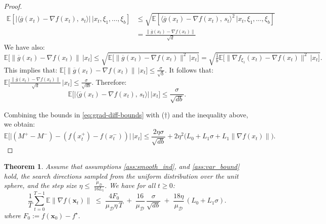 \documentclass[twoside]{article}
\theoremstyle{plain}
\newtheorem{theorem}[lemma]{Theorem}
\theoremstyle{definition}
\theoremstyle{remark}
\def\vx{{\bm{x}}}
\begin{document}
\begin{proof}
\begin{align*}
    \mathbb{E}[ \big|\langle \overline g(x_t)-\nabla f(x_t),\,s_t\rangle\big|   \, |x_t,\xi_1,\ldots,\xi_b  ] &\le \sqrt{ \mathbb{E}[ \langle \overline g(x_t)-\nabla f(x_t),\,s_t\rangle^2   \, |x_t,\xi_1,\ldots,\xi_b   ]  }\\
    &=\frac{\|\overline g(x_t)-\nabla f(x_t)\| }{\sqrt{d}} 
\end{align*}
We  have also:  $\mathbb{E}\big[\|\overline g(x_t)-\nabla f(x_t)\| \, | x_t \big]\le \sqrt{\mathbb{E}\big[ \|\overline g(x_t)-\nabla f(x_t)\|^2 \, | x_t  \big] }=\sqrt{\frac{1}{b} \mathbb{E}\big[ \|\nabla f_{\xi_1}(x_t)-\nabla f(x_t)\|^2 \, | x_t  \big]  }.$ This implies that: $\mathbb{E}\big[\|\overline g(x_t)-\nabla f(x_t)\| \, | x_t \big]\le \frac{\sigma}{\sqrt{b}}.$ It follows that: $\mathbb{E}\big[\frac{\|\overline g(x_t)-\nabla f(x_t)\| }{\sqrt{d}}  \, | x_t\big]\le \frac{\sigma}{\sqrt{db}}.$ Therefore:
$$ \mathbb{E}\big[ \big|\langle \overline g(x_t)-\nabla f(x_t),\,s_t\rangle\big|\, | x_t   \big]\le  \frac{\sigma}{\sqrt{db}}.$$


Combining the bounds in \ref{eq:grad-diff-bounds} with ($\dagger$) and the inequality above, we obtain:
$$\mathbb{E}\big[\big|(M^+-M^-) - (f(x_t^+)-f(x_t^-))\big|  \, \big| x_t\big]\le\frac{2\eta \sigma}{\sqrt{db}}+ 2\eta^2\big(L_0+L_1\sigma + L_1\| \nabla f(x_t) \| \big).$$
\end{proof}





\begin{propbox}

\begin{theorem}\label{lem:indiv-descent}
Assume that assumptions \ref{ass:smooth_ind}, and \ref{ass:var_bound} hold, the search directions sampled from the uniform distribution over the unit sphere, and the step size $
\eta \le \; \frac{\mu_{\mathcal{D}}}{16L_1}
$. We have for all $t \ge 0$:
\[
\frac{1}{T}\sum_{t=0}^{T-1}\mathbb{E}\big\|\nabla f(\vx_t)\big\|
\;\le\;
\frac{4F_0}{\mu_{\mathcal{D}}\eta\,T}
\;+\;\frac{16}{\mu_{\mathcal{D}}}\,\frac{\sigma}{\sqrt{db}}
\;+\;\frac{18\eta}{\mu_{\mathcal{D}}}\,(L_0+L_1\sigma).
\]
where $F_0:=f(\vx_0)-f^\star.$
\end{theorem}
\end{propbox}
\end{document}
